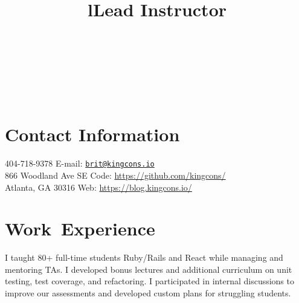 \documentclass[margintitle,line]{res}
\begin{document}

\begin{resume}

\begin{format}
\\
\title{l}\\
\body\\
\end{format}



\section{Contact Information}

404-718-9378 \hfill {E-mail:} \href{mailto:brit@kingcons.io}{\nolinkurl{brit@kingcons.io}} \\
866 Woodland Ave SE \hfill {Code:} \url{https://github.com/kingcons/} \\
Atlanta, GA 30316 \hfill {Web:} \url{https://blog.kingcons.io/} \\


\section{\mbox{Work Experience}}

\title{Lead Instructor}
\begin{position}
  I taught 80+ full-time students Ruby/Rails and React while managing and mentoring TAs.
  I developed bonus lectures and additional curriculum on unit testing, test coverage, and
  refactoring. I participated in internal discussions to improve our assessments and
  developed custom plans for struggling students.
\end{position}


\end{resume}
\end{document}
